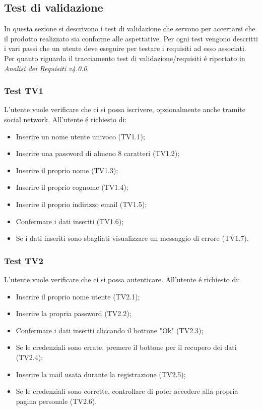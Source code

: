 \subsection{Test di validazione}
In questa sezione si descrivono i test di validazione che servono per accertarsi che il prodotto realizzato sia conforme alle aspettative.
Per ogni test vengono descritti i vari passi che un utente deve eseguire per testare i requisiti ad esso associati. Per quanto riguarda il tracciamento test di validazione/requisiti é riportato in \textit{Analisi dei Requisiti v4.0.0}.

\subsubsection{Test TV1}
L'utente vuole verificare che ci si possa iscrivere, opzionalmente anche tramite social network. \newline
All'utente é richiesto di:
\begin{itemize}
	\item Inserire un nome utente univoco (TV1.1);
	\item Inserire una password di almeno 8 caratteri (TV1.2);
	\item Inserire il proprio nome (TV1.3);
	\item Inserire il proprio cognome (TV1.4);
	\item Inserire il proprio indirizzo email (TV1.5);
	\item Confermare i dati inseriti (TV1.6);
	\item Se i dati inseriti sono sbagliati visualizzare un messaggio di errore (TV1.7).
\end{itemize}

\subsubsection{Test TV2}
L'utente vuole verificare che ci si possa autenticare. \newline
All'utente é richiesto di:
\begin{itemize}
	\item Inserire il proprio nome utente (TV2.1);
	\item Inserire la propria password (TV2.2);
	\item Confermare i dati inseriti cliccando il bottone "Ok" (TV2.3);
	\item Se le credenziali sono errate, premere il bottone per il recupero dei dati (TV2.4);
	\item Inserire la mail usata durante la registrazione (TV2.5);
	\item Se le credenziali sono corrette, controllare di poter accedere alla propria pagina personale (TV2.6).
\end{itemize}


